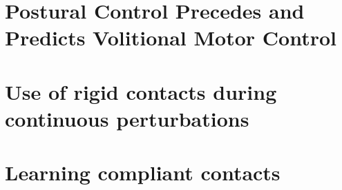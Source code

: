\documentclass[12pt,a4paper,twoside]{report}
\begin{document}
\chapter{Postural Control Precedes and Predicts Volitional Motor Control}\label{sec:ElmarPrePrint}


\chapter{Use of rigid contacts during continuous perturbations}\label{sec:Jernej}


\chapter{Learning compliant contacts}\label{sec:Chie}




\end{document}
